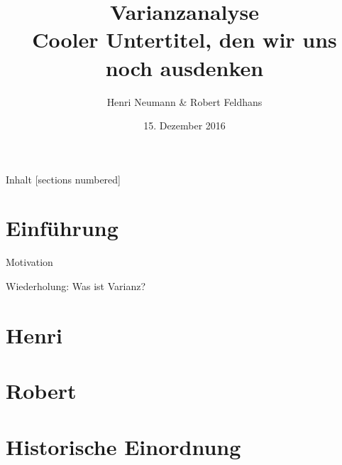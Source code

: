 \documentclass{beamer}
\title{Varianzanalyse\\\normalsize Cooler Untertitel, den wir uns noch ausdenken}
\date{15. Dezember 2016}
\author{Henri Neumann \& Robert Feldhans}
\institute{Experimentelle Psychologie für Nichtpsychologen}
\begin{document}
	\maketitle
	
	\begin{frame}{Inhalt}
		[sections numbered]
		\tableofcontents[hideallsubsections]
	\end{frame}
	
	\section{Einführung}
	
	
	\begin{frame}{Motivation}
		
	\end{frame}
	
	
	\begin{frame}{Wiederholung: Was ist Varianz?}
		
	\end{frame}
	
	
	\section{Henri}
	
	\section{Robert}
	
	
	
	\section{Historische Einordnung}
	
\end{document}
